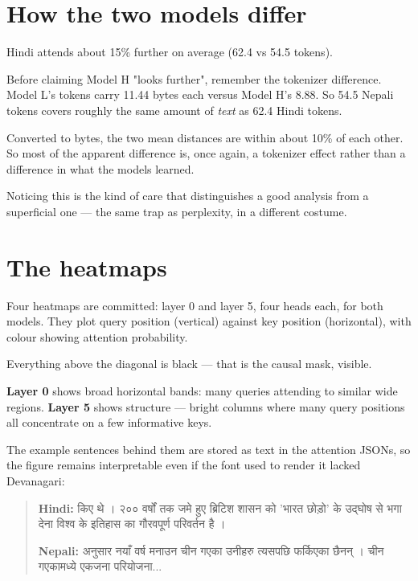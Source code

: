 \documentclass[11pt]{report}
\newcommand{\dn}[1]{{\devanagarifont #1}}
\begin{document}
\section{How the two models differ}

Hindi attends about 15\% further on average (62.4 vs 54.5 tokens).

\begin{notebox}
Before claiming Model H "looks further", remember the tokenizer difference. Model
L's tokens carry 11.44 bytes each versus Model H's 8.88. So 54.5 Nepali tokens
covers roughly the same amount of \emph{text} as 62.4 Hindi tokens.

Converted to bytes, the two mean distances are within about 10\% of each other.
So most of the apparent difference is, once again, a tokenizer effect rather than
a difference in what the models learned.

Noticing this is the kind of care that distinguishes a good analysis from a
superficial one --- the same trap as perplexity, in a different costume.
\end{notebox}

\section{The heatmaps}

Four heatmaps are committed: layer 0 and layer 5, four heads each, for both
models. They plot query position (vertical) against key position (horizontal),
with colour showing attention probability.

Everything above the diagonal is black --- that is the causal mask, visible.

\textbf{Layer 0} shows broad horizontal bands: many queries attending to similar
wide regions. \textbf{Layer 5} shows structure --- bright columns where many query
positions all concentrate on a few informative keys.

The example sentences behind them are stored as text in the attention JSONs, so
the figure remains interpretable even if the font used to render it lacked
Devanagari:

\begin{quote}
\textbf{Hindi:} \dn{किए थे । २०० वर्षों तक जमे हुए ब्रिटिश शासन को 'भारत छोड़ो' के उद्घोष से भगा देना विश्व के इतिहास का गौरवपूर्ण परिवर्तन है ।}

\textbf{Nepali:} \dn{अनुसार नयाँ वर्ष मनाउन चीन गएका उनीहरु त्यसपछि फर्किएका छैनन् । चीन गएकामध्ये एकजना परियोजना...}
\end{quote}
\end{document}
